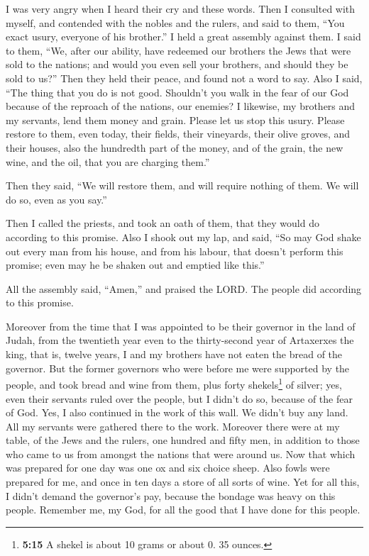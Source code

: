  I was very angry when I heard their cry and these words.
 Then I consulted with myself, and contended with the
nobles and the rulers, and said to them, ``You exact usury, everyone of
his brother.'' I held a great assembly against them.  I
said to them, ``We, after our ability, have redeemed our brothers the
Jews that were sold to the nations; and would you even sell your
brothers, and should they be sold to us?'' Then they held their peace,
and found not a word to say.  Also I said, ``The thing
that you do is not good. Shouldn't you walk in the fear of our God
because of the reproach of the nations, our enemies?  I
likewise, my brothers and my servants, lend them money and grain. Please
let us stop this usury.  Please restore to them, even
today, their fields, their vineyards, their olive groves, and their
houses, also the hundredth part of the money, and of the grain, the new
wine, and the oil, that you are charging them.''

 Then they said, ``We will restore them, and will require
nothing of them. We will do so, even as you say.''

Then I called the priests, and took an oath of them, that they would do
according to this promise.  Also I shook out my lap, and
said, ``So may God shake out every man from his house, and from his
labour, that doesn't perform this promise; even may he be shaken out and
emptied like this.''

All the assembly said, ``Amen,'' and praised the LORD. The people did
according to this promise.

 Moreover from the time that I was appointed to be their
governor in the land of Judah, from the twentieth year even to the
thirty-second year of Artaxerxes the king, that is, twelve years, I and
my brothers have not eaten the bread of the governor. 
But the former governors who were before me were supported by the
people, and took bread and wine from them, plus forty shekels\footnote{\textbf{5:15}
  A shekel is about 10 grams or about 0. 35 ounces.} of silver; yes,
even their servants ruled over the people, but I didn't do so, because
of the fear of God.  Yes, I also continued in the work of
this wall. We didn't buy any land. All my servants were gathered there
to the work.  Moreover there were at my table, of the
Jews and the rulers, one hundred and fifty men, in addition to those who
came to us from amongst the nations that were around us. 
Now that which was prepared for one day was one ox and six choice sheep.
Also fowls were prepared for me, and once in ten days a store of all
sorts of wine. Yet for all this, I didn't demand the governor's pay,
because the bondage was heavy on this people.  Remember
me, my God, for all the good that I have done for this people.


